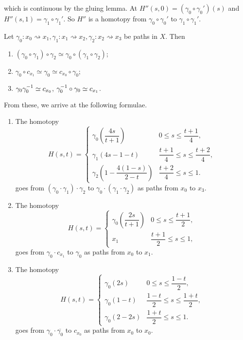 \documentclass{article}
\begin{document}
which is continuous by the gluing lemma. At $ H''(s,0) = (\gamma_0\circ \gamma_0')(s) $ and $ H''(s,1) = \gamma_1\circ\gamma_1' $. So $ H'' $ is a homotopy from $ \gamma_0\circ \gamma_0' $ to $ \gamma_1 \circ\gamma_1' $.
\begin{proposition}
  Let $ \gamma_0: x_0\rightsquigarrow x_1, \gamma_1:x_1\rightsquigarrow x_2, \gamma_2:x_2\rightsquigarrow x_3 $ be paths in $ X $. Then
  \begin{enumerate}
	  \item $ (\gamma_0 \circ \gamma_1) \circ \gamma_2 \simeq \gamma_0 \circ (\gamma_1 \circ \gamma_2) $;
	  \item $ \gamma_0 \circ c_{x_1} \simeq \gamma_0 \simeq c_{x_0} \circ \gamma_0 $;
	  \item $ \gamma_0 {\gamma}^{-1}_0 \simeq c_{x_0} $, $ {\gamma}^{-1}_0\circ \gamma_0\simeq c_{x_1} $.
  \end{enumerate}
\end{proposition}
\pf
From these, we arrive at the following formulae.

\begin{enumerate}
    \item[(i)] The homotopy
    \[
    H(s,t)=
    \begin{cases}
        \gamma_0\left(\dfrac{4s}{t+1}\right)
        & 0\leq s\leq \dfrac{t+1}{4},\\[8pt]
        \gamma_1(4s-1-t)
        & \dfrac{t+1}{4}\leq s\leq \dfrac{t+2}{4},\\[8pt]
        \gamma_2\left(1-\dfrac{4(1-s)}{2-t}\right)
        & \dfrac{t+2}{4}\leq s\leq 1.
    \end{cases}
    \]
    goes from $(\gamma_0\cdot\gamma_1)\cdot\gamma_2$
    to $\gamma_0\cdot(\gamma_1\cdot\gamma_2)$ as paths
    from $x_0$ to $x_3$.

    \item[(ii)] The homotopy
    \[
    H(s,t)=
    \begin{cases}
        \gamma_0\left(\dfrac{2s}{t+1}\right)
        & 0\leq s\leq \dfrac{t+1}{2},\\[8pt]
        x_1
        & \dfrac{t+1}{2}\leq s\leq 1,
    \end{cases}
    \]
    goes from $\gamma_0\cdot c_{x_1}$ to $\gamma_0$ as paths
    from $x_0$ to $x_1$.

    \item[(iii)] The homotopy
    \[
    H(s,t)=
    \begin{cases}
        \gamma_0(2s)
        & 0\leq s\leq \dfrac{1-t}{2},\\[8pt]
        \gamma_0(1-t)
        & \dfrac{1-t}{2}\leq s\leq \dfrac{1+t}{2},\\[8pt]
        \gamma_0(2-2s)
        & \dfrac{1+t}{2}\leq s\leq 1.
    \end{cases}
    \]
    goes from $\gamma_0\cdot\overline{\gamma_0}$
    to $c_{x_0}$ as paths from $x_0$ to $x_0$.
\end{enumerate}
\end{document}
